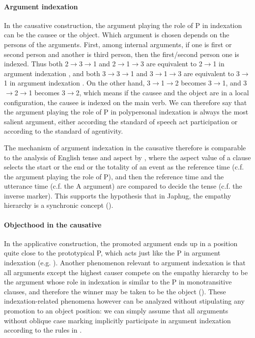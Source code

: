 \documentclass[a4paper, oneside, 12pt]{report}
\newcommand*{\textto}{$\to$}
\newcommand*{\citesec}[1]{\S~{#1}}
\newcommand*{\citepage}[1]{p.~{#1}}
\begin{document}
\paragraph*{Argument indexation}\label{sec:voice.causative.indexation}
In the causative construction, the argument playing the role of P in indexation
can be the causee or the object.
Which argument is chosen depends on the persons of the arguments.
First, among internal arguments,
if one is first or second person and another is third person,
then the first/second person one is indexed.
Thus both 2\textto 3\textto 1 and 2\textto 1\textto 3 
are equivalent to 2\textto 1 in argument indexation
\citep[\citepage{584}]{jacques2021grammar},
and both 3\textto 3\textto 1 and 3\textto 1\textto 3 
are equivalent to 3\textto 1 in argument indexation
\citep[\citepage{310}]{jacques2021grammar}.
On the other hand, 3\textto 1\textto 2 becomes 3\textto 1,
and 3\textto 2\textto 1 becomes 3\textto 2,
which means if the causee and the object are in a local configuration,
the causee is indexed on the main verb.
We can therefore say that the argument playing the role of P in polypersonal indexation
is always the most salient argument,
either according the standard of speech act participation or according to the standard of agentivity.

The mechanism of argument indexation in the causative
therefore is comparable to the analysis of English tense and aspect 
by \citet[\citesec{7.4.1}]{wiltschko2014universal},
where the aspect value of a clause selects the start or the end or the totality of an event
as the reference time (c.f. the argument playing the role of P),
and then the reference time and the utterance time (c.f. the A argument)
are compared to decide the tense (c.f. the inverse marker).
This supports the hypothesis that in Japhug,
the empathy hierarchy is a synchronic concept
().

\paragraph*{Objecthood in the causative}
In the applicative construction,
the promoted argument ends up in a position quite close to the prototypical P,
which acts just like the P in argument indexation
(e.g. \citealt[\citepage{863}, (102)]{jacques2021grammar}).
Another phenomenon relevant to argument indexation is that
all arguments except the highest causer compete on the empathy hierarchy
to be the argument whose role in indexation is similar to the P in monotransitive clauses,
and therefore the winner may be taken to be the object
().
These indexation-related phenomena however can be analyzed without stipulating 
any promotion to an object position:
we can simply assume that all arguments without oblique case marking
implicitly participate in argument indexation 
according to the rules in .
\end{document}
